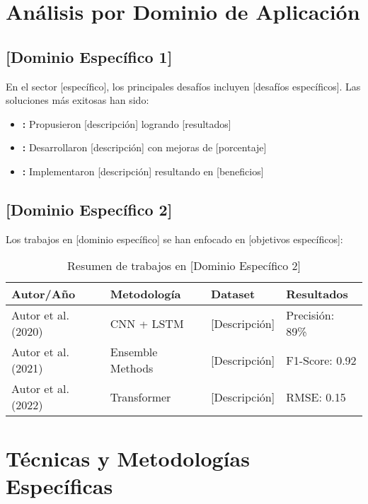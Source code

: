 \section{Análisis por Dominio de Aplicación}

\subsection{[Dominio Específico 1]}

En el sector [específico], los principales desafíos incluyen [desafíos específicos]. Las soluciones más exitosas han sido:

\begin{itemize}
    \item \textbf{\citet{autor2020_dominio1}:} Propusieron [descripción] logrando [resultados]
    \item \textbf{\citet{autor2021_dominio1}:} Desarrollaron [descripción] con mejoras de [porcentaje]%
    \item \textbf{\citet{autor2022_dominio1}:} Implementaron [descripción] resultando en [beneficios]
\end{itemize}

\subsection{[Dominio Específico 2]}

Los trabajos en [dominio específico] se han enfocado en [objetivos específicos]:

\begin{table}[htbp]
\centering
\caption{Resumen de trabajos en [Dominio Específico 2]}
\begin{tabular}{@{}p{3cm}p{4cm}p{3cm}p{3cm}@{}}
\toprule
\textbf{Autor/Año} & \textbf{Metodología} & \textbf{Dataset} & \textbf{Resultados} \\
\midrule
Autor et al. (2020) & CNN + LSTM & [Descripción] & Precisión: 89\% \\
Autor et al. (2021) & Ensemble Methods & [Descripción] & F1-Score: 0.92 \\
Autor et al. (2022) & Transformer & [Descripción] & RMSE: 0.15 \\
\bottomrule
\end{tabular}
\label{tab:trabajos_dominio2}
\end{table}

\section{Técnicas y Metodologías Específicas}

